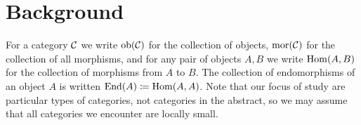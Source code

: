 \chapter{Background}

For a category $\mathcal{C}$ we write $\operatorname{ob}(\mathcal{C})$ for the collection of objects, $\operatorname{mor}(\mathcal{C})$ for the collection of all morphisms, and for any pair of objects $A,B$ we write $\operatorname{Hom}(A,B)$ for the collection of morphisms from $A$ to $B$. The collection of endomorphisms of an object $A$ is written $\operatorname{End}(A) \coloneqq \operatorname{Hom}(A,A)$. Note that our focus of study are particular types of categories, not categories in the abstract, so we may assume that all categories we encounter are locally small.







